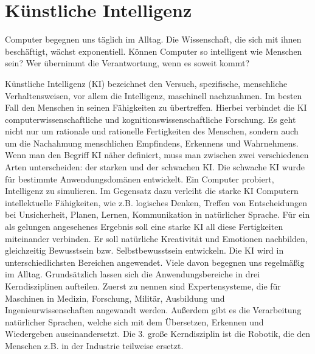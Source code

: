 \section{Künstliche Intelligenz}

Computer begegnen uns täglich im Alltag. Die Wissenschaft, die sich mit ihnen beschäftigt, wächst exponentiell. Können Computer so intelligent wie Menschen sein? Wer übernimmt die Verantwortung, wenn es soweit kommt?

Künstliche Intelligenz (KI) bezeichnet den Versuch, spezifische, menschliche Verhaltensweisen, vor allem die Intelligenz, maschinell nachzuahmen. Im besten Fall den Menschen in seinen Fähigkeiten zu übertreffen. Hierbei verbindet die KI computerwissenschaftliche und kognitionswissenschaftliche Forschung.
Es geht nicht nur um rationale und rationelle Fertigkeiten des Menschen, sondern auch um die Nachahmung menschlichen Empfindens, Erkennens und Wahrnehmens.
Wenn man den Begriff KI näher definiert, muss man zwischen zwei verschiedenen Arten unterscheiden: der starken und der schwachen KI. Die schwache KI wurde für bestimmte Anwendungsdomänen entwickelt. Ein Computer probiert, Intelligenz zu simulieren. Im Gegensatz dazu verleiht die starke KI Computern intellektuelle Fähigkeiten, wie z.B. logisches Denken, Treffen von Entscheidungen bei Unsicherheit, Planen, Lernen, Kommunikation in natürlicher Sprache. Für ein als gelungen angesehenes Ergebnis soll eine starke KI all diese Fertigkeiten miteinander verbinden. Er soll natürliche Kreativität und Emotionen nachbilden, gleichzeitig Bewusstsein bzw. Selbstbewusstsein entwickeln.
Die KI wird in unterschiedlichsten Bereichen angewendet. Viele davon begegnen uns regelmäßig im Alltag. Grundsätzlich lassen sich die Anwendungsbereiche in drei Kerndisziplinen aufteilen. Zuerst zu nennen sind Expertensysteme, die für Maschinen in Medizin, Forschung, Militär, Ausbildung und Ingenieurwissenschaften angewandt werden. Außerdem gibt es die Verarbeitung natürlicher Sprachen, welche sich mit dem Übersetzen, Erkennen und Wiedergeben auseinandersetzt. Die 3. große Kerndisziplin ist die Robotik, die den Menschen z.B. in der Industrie teilweise ersetzt.

